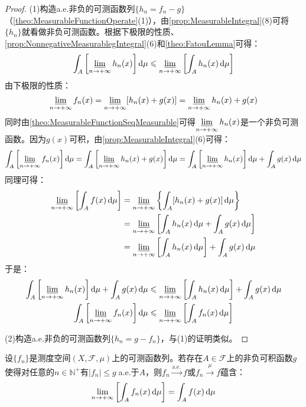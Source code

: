 \begin{proof}
	(1)构造a.e.非负的可测函数列$\{h_n=f_n-g\}$（\cref{theo:MeasurableFunctionOperate}(1)），由\cref{prop:MeasurableIntegral}(8)可将$\{h_n\}$就看做非负可测函数。根据下极限的性质、\cref{prop:NonnegativeMeasurablegIntegral}(6)和\cref{theo:FatouLemma}可得：
	\begin{equation*}
		\int_{A}\left[\varliminf_{n\to+\infty}h_n(x)\right]\mathop{}\!\mathrm{d}\mu\leqslant\varliminf_{n\to+\infty}\left[\int_{A}h_n(x)\mathop{}\!\mathrm{d}\mu\right]
	\end{equation*}
	由下极限的性质：
	\begin{equation*}
		\varliminf_{n\to+\infty}f_n(x)=\varliminf_{n\to+\infty}[h_n(x)+g(x)]=\varliminf_{n\to+\infty}h_n(x)+g(x)
	\end{equation*}
	同时由\cref{theo:MeasurableFunctionSeqMeasurable}可得$\varliminf\limits_{n\to+\infty}h_n(x)$是一个非负可测函数。因为$g(x)$可积，由\cref{prop:MeasurableIntegral}(6)可得：
	\begin{equation*}
		\int_{A}\left[\varliminf_{n\to+\infty}f_n(x)\right]\mathop{}\!\mathrm{d}\mu=\int_{A}\left[\varliminf_{n\to+\infty}h_n(x)+g(x)\right]\mathop{}\!\mathrm{d}\mu=\int_{A}\left[\varliminf_{n\to+\infty}h_n(x)\right]\mathop{}\!\mathrm{d}\mu+\int_{A}g(x)\mathop{}\!\mathrm{d}\mu
	\end{equation*}
	同理可得：
	\begin{align*}
		\varliminf_{n\to+\infty}\left[\int_{A}f(x)\mathop{}\!\mathrm{d}\mu\right]&=\varliminf_{n\to+\infty}\left\{\int_{A}[h_n(x)+g(x)]\mathop{}\!\mathrm{d}\mu\right\} \\
		&=\varliminf_{n\to+\infty}\left[\int_{A}h_n(x)\mathop{}\!\mathrm{d}\mu+\int_{A}g(x)\mathop{}\!\mathrm{d}\mu\right] \\
		&=\varliminf_{n\to+\infty}\left[\int_{A}h_n(x)\mathop{}\!\mathrm{d}\mu\right]+\int_{A}g(x)\mathop{}\!\mathrm{d}\mu
	\end{align*}
	于是：
	\begin{gather*}
		\int_{A}\left[\varliminf_{n\to+\infty}h_n(x)\right]\mathop{}\!\mathrm{d}\mu+\int_{A}g(x)\mathop{}\!\mathrm{d}\mu\leqslant\varliminf_{n\to+\infty}\left[\int_{A}h_n(x)\mathop{}\!\mathrm{d}\mu\right]+\int_{A}g(x)\mathop{}\!\mathrm{d}\mu \\
		\int_{A}\left[\varliminf_{n\to+\infty}f_n(x)\right]\mathop{}\!\mathrm{d}\mu\leqslant\varliminf_{n\to+\infty}\left[\int_{A}f_n(x)\mathop{}\!\mathrm{d}\mu\right]
	\end{gather*}\par
	(2)构造a.e.非负的可测函数列$\{h_n=g-f_n\}$，与(1)的证明类似。
\end{proof}
\begin{theorem}[Lebesgue控制收敛定理]\label{theo:DominatedConvergenceTheorem}
	设$\{f_n\}$是测度空间$(X,\mathscr{F},\mu)$上的可测函数列。若存在$A\in\mathscr{F}$上的非负可积函数$g$使得对任意的$n\in\mathbb{N}^+$有$|f_n|\leqslant g\;$a.e.于$A$，则$f_n\overset{\text{a.e.}}{\longrightarrow}f$或$f_n\overset{\mu}{\longrightarrow}f$蕴含：
	\begin{equation*}
		\lim_{n\to+\infty}\left[\int_{A}f_n(x)\mathop{}\!\mathrm{d}\mu\right]=\int_{A}f(x)\mathop{}\!\mathrm{d}\mu
	\end{equation*}
\end{theorem}
